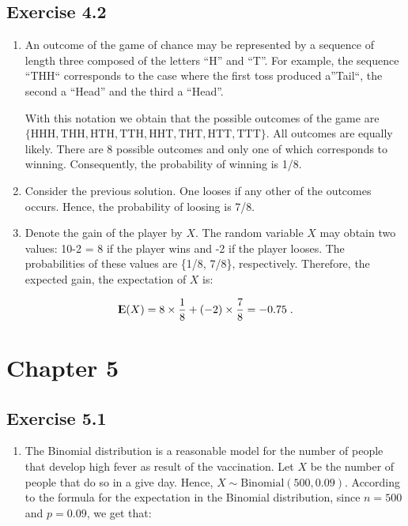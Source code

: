 \documentclass[]{krantz}
\providecommand{\tightlist}{%
  \setlength{\itemsep}{0pt}\setlength{\parskip}{0pt}}
\newcommand{\Expec}{{\rm I\kern-.3em E}}
\theoremstyle{definition}
\theoremstyle{definition}
\theoremstyle{definition}
\theoremstyle{remark}
\begin{document}
\hypertarget{exercise-4.2}{%
\subsection*{Exercise 4.2}\label{exercise-4.2}}


\begin{enumerate}
\def\labelenumi{\arabic{enumi}.}
\item
  An outcome of the game of chance
  may be represented by a sequence of length three composed of the letters
  ``H'' and ``T''. For example, the sequence ``THH`` corresponds to the case
  where the first toss produced a''Tail``, the second a ``Head'' and the
  third a ``Head''.

  With this notation we obtain that the possible outcomes of the game are
  \(\{\mbox{HHH}, \mbox{THH},\mbox{HTH}, \mbox{TTH},\mbox{HHT}, \mbox{THT},\mbox{HTT}, \mbox{TTT}\}\). All outcomes are equally likely. There are 8 possible outcomes and only
  one of which corresponds to winning. Consequently, the probability of winning is 1/8.
\item
  Consider the previous solution.
  One looses if any other of the outcomes occurs. Hence, the probability
  of loosing is 7/8.
\item
  Denote the gain of the player by
  \(X\). The random variable \(X\) may obtain two values: 10-2 = 8 if the
  player wins and -2 if the player looses. The probabilities of these
  values are \{1/8, 7/8\}, respectively. Therefore, the expected gain, the
  expectation of \(X\) is:
\end{enumerate}

\[\Expec(X) = 8 \times \frac{1}{8} + (-2) \times \frac{7}{8} =-0.75\;.\]

\hypertarget{chapter-5}{%
\section*{Chapter 5}\label{chapter-5}}


\hypertarget{exercise-5.1}{%
\subsection*{Exercise 5.1}\label{exercise-5.1}}


\begin{enumerate}
\def\labelenumi{\arabic{enumi}.}
\tightlist
\item
  The Binomial distribution is a
  reasonable model for the number of people that develop high fever as
  result of the vaccination. Let \(X\) be the number of people that do so in
  a give day. Hence, \(X \sim \mbox{Binomial}(500,0.09)\). According to the
  formula for the expectation in the Binomial distribution, since \(n=500\)
  and \(p=0.09\), we get that:
\end{enumerate}
\end{document}
